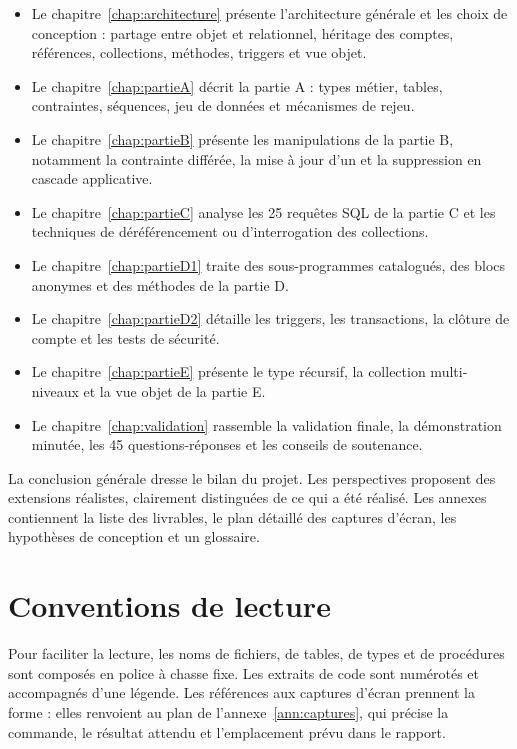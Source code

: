 \begin{itemize}
  \item Le chapitre~\ref{chap:architecture} présente l'architecture générale
        et les choix de conception : partage entre objet et relationnel,
        héritage des comptes, références, collections, méthodes, triggers et
        vue objet.
  \item Le chapitre~\ref{chap:partieA} décrit la partie A : types métier,
        tables, contraintes, séquences, jeu de données et mécanismes de
        rejeu.
  \item Le chapitre~\ref{chap:partieB} présente les manipulations de la
        partie B, notamment la contrainte différée, la mise à jour d'un
         et la suppression en cascade applicative.
  \item Le chapitre~\ref{chap:partieC} analyse les 25 requêtes SQL de la
        partie C et les techniques de déréférencement ou d'interrogation des
        collections.
  \item Le chapitre~\ref{chap:partieD1} traite des sous-programmes
        catalogués, des blocs anonymes et des méthodes de la partie D.
  \item Le chapitre~\ref{chap:partieD2} détaille les triggers, les
        transactions, la clôture de compte et les tests de sécurité.
  \item Le chapitre~\ref{chap:partieE} présente le type récursif, la
        collection multi-niveaux et la vue objet de la partie E.
  \item Le chapitre~\ref{chap:validation} rassemble la validation finale, la
        démonstration minutée, les 45 questions-réponses et les conseils de
        soutenance.
\end{itemize}

La conclusion générale dresse le bilan du projet. Les perspectives proposent
des extensions réalistes, clairement distinguées de ce qui a été réalisé. Les
annexes contiennent la liste des livrables, le plan détaillé des captures
d'écran, les hypothèses de conception et un glossaire.

\section{Conventions de lecture}

Pour faciliter la lecture, les noms de fichiers, de tables, de types et de
procédures sont composés en police à chasse fixe. Les extraits de code sont
numérotés et accompagnés d'une légende. Les références aux captures d'écran
prennent la forme  : elles renvoient au plan de l'annexe~\ref{ann:captures},
qui précise la commande, le résultat attendu et l'emplacement prévu dans le
rapport.

